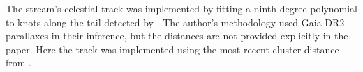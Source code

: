 The stream's celestial track was implemented by fitting a ninth degree polynomial to knots along the tail detected by \citet[][data provided by A. Sollima in priv. comm]{Sollima2020}. The author's methodology used Gaia DR2 parallaxes in their inference, but the distances are not provided explicitly in the paper. Here the track was implemented using the most recent cluster distance from \citet{Baumgardt2021}.
